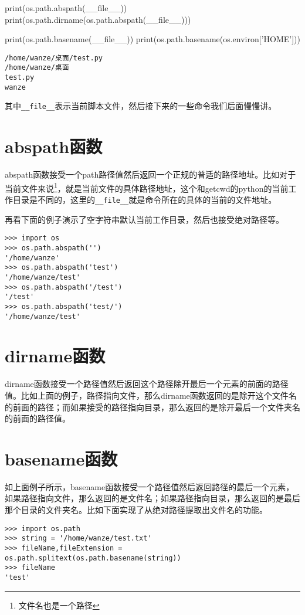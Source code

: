 \documentclass[12pt,oneside]{book}
\begin{document}
\begin{common-format}
\begin{tcbpython}[]
print(os.path.abspath(__file__))
print(os.path.dirname(os.path.abspath(__file__)))

print(os.path.basename(__file__))
print(os.path.basename(os.environ['HOME']))

\end{tcbpython}
\begin{Verbatim}
/home/wanze/桌面/test.py
/home/wanze/桌面
test.py
wanze
\end{Verbatim}

其中\verb+__file__+表示当前脚本文件，然后接下来的一些命令我们后面慢慢讲。

\section{abspath函数}
abspath函数接受一个path路径值然后返回一个正规的普适的路径地址。比如对于当前文件来说\footnote{文件名也是一个路径}，就是当前文件的具体路径地址，这个和getcwd的python的当前工作目录是不同的，这里的\verb+__file__+就是命令所在的具体的当前的文件地址。

再看下面的例子演示了空字符串默认当前工作目录，然后也接受绝对路径等。
\begin{Verbatim}
>>> import os
>>> os.path.abspath('')
'/home/wanze'
>>> os.path.abspath('test')
'/home/wanze/test'
>>> os.path.abspath('/test')
'/test'
>>> os.path.abspath('test/')
'/home/wanze/test'
\end{Verbatim}

\section{dirname函数}
dirname函数接受一个路径值然后返回这个路径除开最后一个元素的前面的路径值。比如上面的例子，路径指向文件，那么dirname函数返回的是除开这个文件名的前面的路径；而如果接受的路径指向目录，那么返回的是除开最后一个文件夹名的前面的路径值。

\section{basename函数}
如上面例子所示，basename函数接受一个路径值然后返回路径的最后一个元素，如果路径指向文件，那么返回的是文件名；如果路径指向目录，那么返回的是最后那个目录的文件夹名。比如下面实现了从绝对路径提取出文件名的功能。
\begin{Verbatim}
>>> import os.path
>>> string = '/home/wanze/test.txt'
>>> fileName,fileExtension = os.path.splitext(os.path.basename(string))
>>> fileName
'test'
\end{Verbatim}





\end{common-format}
\end{document}
